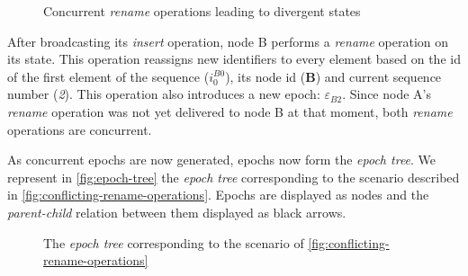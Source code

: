 \documentclass[10pt,journal,compsoc]{IEEEtran}
\let\MYoriglatexcaption\caption
\renewcommand{\caption}[2][\relax]{\MYoriglatexcaption[#2]{#2}}
\newcommand{\trm}[1]{\mathit{#1}}
\newcommand{\id}[3]{$\trm{#1}^{\trm{#2}}_{\trm{#3}}$}
\newcommand{\epoch}[1]{$\varepsilon_{#1}$}
\begin{document}
\begin{figure}[t!]
    \caption{Concurrent \emph{rename} operations leading to divergent states}
    \label{fig:conflicting-rename-operations}
\end{figure}

After broadcasting its \emph{insert} operation, node B performs a \emph{rename} operation on its state.
This operation reassigns new identifiers to every element based on the id of the first element of the sequence (\id{i}{B0}{0}), its node id (\textbf{B}) and current sequence number (\emph{2}).
This operation also introduces a new epoch: \epoch{B2}.
Since node A's \emph{rename} operation was not yet delivered to node B at that moment, both \emph{rename} operations are concurrent.

As concurrent epochs are now generated, epochs now form the \emph{epoch tree}.
We represent in \autoref{fig:epoch-tree} the \emph{epoch tree} corresponding to the scenario described in \autoref{fig:conflicting-rename-operations}.
Epochs are displayed as nodes and the \emph{parent-child} relation between them displayed as black arrows.

\begin{figure}[t!]
    \centering
    \caption{The \emph{epoch tree} corresponding to the scenario of \autoref{fig:conflicting-rename-operations}}
    \label{fig:epoch-tree}
\end{figure}
\end{document}
